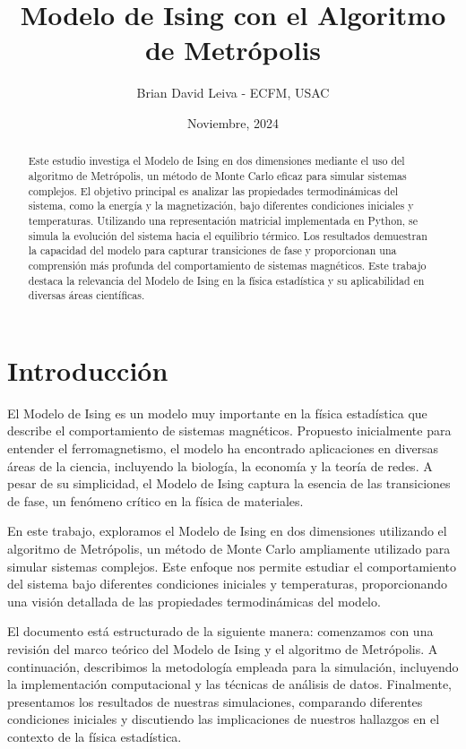 \documentclass[twocolumn]{article}
\title{Modelo de Ising con el Algoritmo de Metrópolis}
\author{Brian David Leiva - ECFM, USAC}
\date{Noviembre, 2024}
\begin{document}
\maketitle

\begin{abstract}
Este estudio investiga el Modelo de Ising en dos dimensiones mediante el uso del algoritmo de Metrópolis, un método de Monte Carlo eficaz para simular sistemas complejos. El objetivo principal es analizar las propiedades termodinámicas del sistema, como la energía y la magnetización, bajo diferentes condiciones iniciales y temperaturas. Utilizando una representación matricial implementada en Python, se simula la evolución del sistema hacia el equilibrio térmico. Los resultados demuestran la capacidad del modelo para capturar transiciones de fase y proporcionan una comprensión más profunda del comportamiento de sistemas magnéticos. Este trabajo destaca la relevancia del Modelo de Ising en la física estadística y su aplicabilidad en diversas áreas científicas.
\end{abstract}

\section{Introducción}

El Modelo de Ising es un modelo muy importante en la física estadística que describe el comportamiento de sistemas magnéticos. Propuesto inicialmente para entender el ferromagnetismo, el modelo ha encontrado aplicaciones en diversas áreas de la ciencia, incluyendo la biología, la economía y la teoría de redes. A pesar de su simplicidad, el Modelo de Ising captura la esencia de las transiciones de fase, un fenómeno crítico en la física de materiales.

En este trabajo, exploramos el Modelo de Ising en dos dimensiones utilizando el algoritmo de Metrópolis, un método de Monte Carlo ampliamente utilizado para simular sistemas complejos. Este enfoque nos permite estudiar el comportamiento del sistema bajo diferentes condiciones iniciales y temperaturas, proporcionando una visión detallada de las propiedades termodinámicas del modelo.

El documento está estructurado de la siguiente manera: comenzamos con una revisión del marco teórico del Modelo de Ising y el algoritmo de Metrópolis. A continuación, describimos la metodología empleada para la simulación, incluyendo la implementación computacional y las técnicas de análisis de datos. Finalmente, presentamos los resultados de nuestras simulaciones, comparando diferentes condiciones iniciales y discutiendo las implicaciones de nuestros hallazgos en el contexto de la física estadística.
\end{document}
